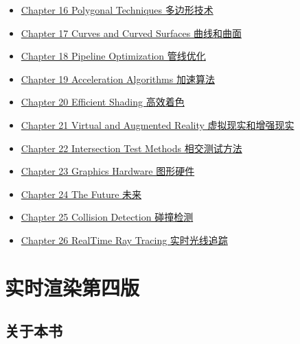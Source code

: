 \documentclass[
  paper=a4,
  ,captions=tableheading
]{scrartcl}
\begin{document}
\begin{itemize}
\begin{itemize}
\begin{itemize}
{      15 NonPhotorealistic Rendering 非真实感渲染}
    \item
      \hyperref[Chapter-16-Polygonal-Techniques-ux591aux8fb9ux5f62ux6280ux672f]{Chapter
      16 Polygonal Techniques 多边形技术}
    \item
      \hyperref[Chapter-17-Curves-and-Curved-Surfaces-ux66f2ux7ebfux548cux66f2ux9762]{Chapter
      17 Curves and Curved Surfaces 曲线和曲面}
    \item
      \hyperref[Chapter-18-Pipeline-Optimization-ux7ba1ux7ebfux4f18ux5316]{Chapter
      18 Pipeline Optimization 管线优化}
    \item
      \hyperref[Chapter-19-Acceleration-Algorithms-ux52a0ux901fux7b97ux6cd5]{Chapter
      19 Acceleration Algorithms 加速算法}
    \item
      \hyperref[Chapter-20-Efficient-Shading-ux9ad8ux6548ux7740ux8272]{Chapter
      20 Efficient Shading 高效着色}
    \item
      \hyperref[Chapter-21-Virtual-and-Augmented-Reality-ux865aux62dfux73b0ux5b9eux548cux589eux5f3aux73b0ux5b9e]{Chapter
      21 Virtual and Augmented Reality 虚拟现实和增强现实}
    \item
      \hyperref[Chapter-22-Intersection-Test-Methods-ux76f8ux4ea4ux6d4bux8bd5ux65b9ux6cd5]{Chapter
      22 Intersection Test Methods 相交测试方法}
    \item
      \hyperref[Chapter-23-Graphics-Hardware-ux56feux5f62ux786cux4ef6]{Chapter
      23 Graphics Hardware 图形硬件}
    \item
      \hyperref[Chapter-24-The-Future-ux672aux6765]{Chapter 24 The
      Future 未来}
    \item
      \hyperref[Chapter-25-Collision-Detection-ux78b0ux649eux68c0ux6d4b]{Chapter
      25 Collision Detection 碰撞检测}
    \item
      \hyperref[Chapter-26-RealTime-Ray-Tracing-ux5b9eux65f6ux5149ux7ebfux8ffdux8e2a]{Chapter
      26 RealTime Ray Tracing 实时光线追踪}
    \end{itemize}
  \end{itemize}
\end{itemize}

\section{实时渲染第四版}\label{ux5b9eux65f6ux6e32ux67d3ux7b2cux56dbux7248}

\subsection{关于本书}\label{ux5173ux4e8eux672cux4e66}
\end{document}
